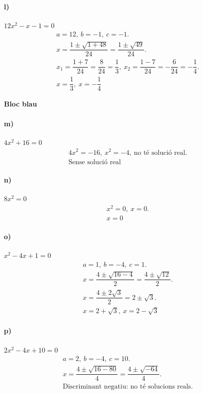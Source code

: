 \documentclass[11pt,a4paper]{article}
\begin{document}
\paragraph{l)} $12x^2 - x - 1 = 0$
\[
\begin{aligned}
a=12,\ b=-1,\ c=-1. \\
x=\dfrac{1\pm\sqrt{1+48}}{24}=\dfrac{1\pm\sqrt{49}}{24}. \\
x_1=\dfrac{1+7}{24}=\dfrac{8}{24}=\dfrac{1}{3},\ x_2=\dfrac{1-7}{24}=-\dfrac{6}{24}=-\dfrac{1}{4}. \\
\boxed{x=\dfrac{1}{3},\ x=-\dfrac{1}{4}}
\end{aligned}
\]

\textbf{Bloc blau}

\paragraph{m)} $4x^2 + 16 = 0$
\[
\begin{aligned}
4x^2=-16,\ x^2=-4,\ \text{no té solució real}. \\
\boxed{\text{Sense solució real}}
\end{aligned}
\]

\paragraph{n)} $8x^2 = 0$
\[
\begin{aligned}
x^2=0,\ x=0. \\
\boxed{x=0}
\end{aligned}
\]

\paragraph{o)} $x^2 - 4x + 1 = 0$
\[
\begin{aligned}
a=1,\ b=-4,\ c=1. \\
x=\dfrac{4\pm\sqrt{16-4}}{2}=\dfrac{4\pm\sqrt{12}}{2}. \\
x=\dfrac{4\pm2\sqrt{3}}{2}=2\pm\sqrt{3}. \\
\boxed{x=2+\sqrt{3},\ x=2-\sqrt{3}}
\end{aligned}
\]

\paragraph{p)} $2x^2 - 4x + 10 = 0$
\[
\begin{aligned}
a=2,\ b=-4,\ c=10. \\
x=\dfrac{4\pm\sqrt{16-80}}{4}=\dfrac{4\pm\sqrt{-64}}{4}. \\
\text{Discriminant negatiu: no té solucions reals}. \\
\end{aligned}
\]
\end{document}
